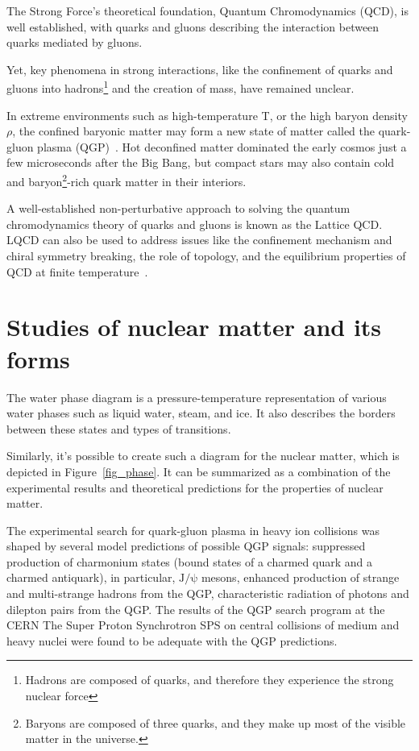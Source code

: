 \newpage

The Strong Force's theoretical foundation, Quantum Chromodynamics (QCD), is well established, with quarks and gluons describing the interaction between quarks mediated by gluons.

Yet, key phenomena in strong interactions, like the confinement of quarks and gluons into hadrons\footnote{Hadrons are composed of quarks, and therefore they experience the strong nuclear force} and the creation of mass, have remained unclear.

In extreme environments such as high-temperature T, or the high baryon density $\rho$, the confined baryonic matter may form a new state of matter called the quark-gluon plasma (\gls{QGP})~\cite{phase_diagram}. Hot deconfined matter dominated the early cosmos just a few microseconds after the Big Bang, but compact stars may also contain cold and baryon\footnote{Baryons are composed of three quarks, and they make up most of the visible matter in the universe.}-rich quark matter in their interiors.

A well-established non-perturbative approach to solving the quantum chromodynamics theory of quarks and gluons is known as the Lattice \gls{QCD}. LQCD can also be used to address issues like the confinement mechanism and chiral symmetry breaking, the role of topology, and the equilibrium properties of \gls{QCD} at finite temperature~\cite{lattice_qcd}. 

\section{Studies of nuclear matter and its forms}
The water phase diagram is a pressure-temperature representation of various water phases such as liquid water, steam, and ice. It also describes the borders between these states and types of transitions. 

Similarly, it's possible to create such a diagram for the nuclear matter, which is depicted in Figure~\ref{fig_phase}. It can be summarized as a combination of the experimental results and theoretical predictions for the properties of nuclear matter.

The experimental search for quark-gluon plasma in heavy ion
collisions was shaped by several model predictions of possible \gls{QGP} signals: suppressed production of charmonium states (bound states of a charmed quark and a charmed antiquark), in particular, $\mathrm{J/\psi}$ mesons, enhanced production of strange and multi-strange hadrons from the \gls{QGP}, characteristic radiation of photons and dilepton pairs from the \gls{QGP}. The results of the QGP search program at the \gls{CERN} The Super Proton Synchrotron \gls{SPS} on central collisions of medium and heavy nuclei were found to be adequate with the QGP predictions.

